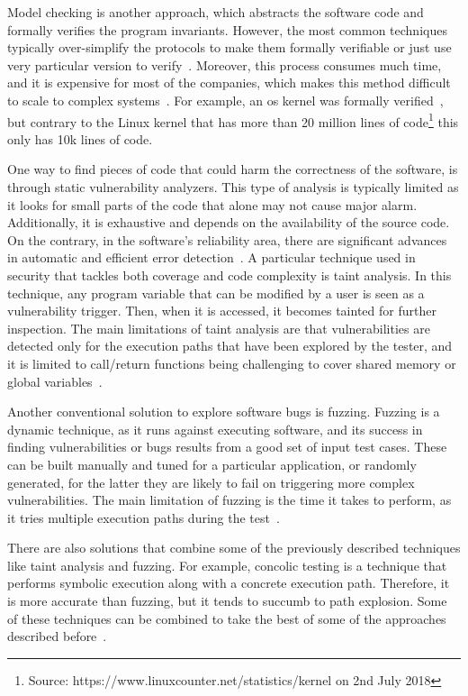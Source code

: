 Model checking is another approach, which abstracts the software code and formally verifies the program invariants.
However, the most common techniques typically over-simplify the protocols to make them formally verifiable or just use very particular version to verify~\cite{Klein:2009,Chen:2015,Nelson:2017}. 
Moreover, this process consumes much time, and it is expensive for most of the companies, which makes this method difficult to scale to complex systems~\cite{Giuffrida:2013}.
For example, an \gls{os} kernel was formally verified~\cite{Klein:2009}, but contrary to the Linux kernel that has more than 20 million lines of code\footnote{Source: https://www.linuxcounter.net/statistics/kernel on 2nd July 2018} this only has 10k lines of code.


One way to find pieces of code that could harm the correctness of the software, is through static vulnerability analyzers.
This type of analysis is typically limited as it looks for small parts of the code that alone may not cause major alarm.
Additionally, it is exhaustive and depends on the availability of the source code.
On the contrary, in the software's reliability area, there are significant advances in automatic and efficient error detection~\cite{Xu:2016}.
A particular technique used in security that tackles both coverage and code complexity is taint analysis.
In this technique, any program variable that can be modified by a user is seen as a vulnerability trigger. 
Then, when it is accessed, it becomes tainted for further inspection.
The main limitations of taint analysis are that vulnerabilities are detected only for the execution paths that have been explored by the tester, and it is limited to call/return functions being challenging to cover shared memory or global variables~\cite{Yamaguchi:2015}.


Another conventional solution to explore software bugs is fuzzing.
Fuzzing is a dynamic technique, as it runs against executing software, and its success in finding vulnerabilities or bugs results from a good set of input test cases.
These can be built manually and tuned for a particular application, or randomly generated, for the latter they are likely to fail on triggering more complex vulnerabilities.
The main limitation of fuzzing is the time it takes to perform, as it tries multiple execution paths during the test~\cite{Gan:2018}.


There are also solutions that combine some of the previously described techniques like taint analysis and fuzzing.
For example, concolic testing is a technique that performs symbolic execution along with a concrete execution path. 
Therefore, it is more accurate than fuzzing, but it tends to succumb to path explosion.
Some of these techniques can be combined to take the best of some of the approaches described before~\cite{Stephens:2016}.


